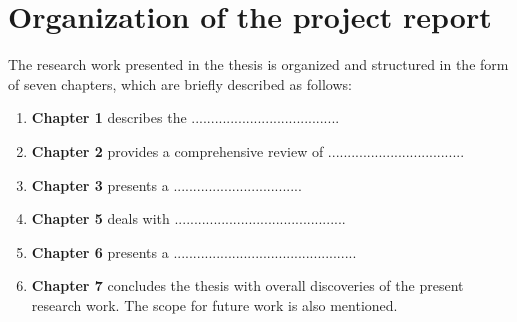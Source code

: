 \section{Organization of the project report} \label{S1.4}
The research work presented in the thesis is organized and structured in the form of seven chapters, which are briefly described as follows:
\begin{enumerate}[label=\textbf{\roman*)}]
	\item \textbf{Chapter 1} describes the ......................................
	\item \textbf{Chapter 2} provides a comprehensive review of ...................................
	\item \textbf{Chapter 3} presents a .................................
	\item \textbf{Chapter 5} deals with ............................................
	\item \textbf{Chapter 6} presents a ...............................................
	\item \textbf{Chapter 7} concludes the thesis with overall discoveries of the present research work. The scope for future work is also mentioned. 
\end{enumerate} 
